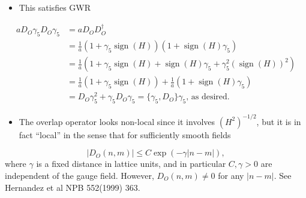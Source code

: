 \begin{itemize}
  \item This satisfies GWR
\end{itemize}

\begin{align}
    a D_O \gamma_5 D_O \gamma_5 &= a D_O D_O^\dagger \nonumber \\
    &=\frac{1}{a}(1 + \gamma_5 \operatorname{sign}(H))(1 + \operatorname{sign}(H)\gamma_5) \nonumber \\
    &=\frac{1}{a}(1 + \gamma_5 \operatorname{sign}(H) + \operatorname{sign}(H) \gamma_5 + \gamma_5^2(\operatorname{sign}(H))^2) \nonumber \\
    &=\frac{1}{a}(1 + \gamma_5 \operatorname{sign}(H))+\frac{1}{a}(1 + \operatorname{sign}(H)\gamma_5) \nonumber \\
    &=D_O\gamma_5^2 + \gamma_5D_O \gamma_5 = \{\gamma_5,D_O\}\gamma_5\text{, as desired.}
\end{align}

\begin{itemize}
    \item The overlap operator looks non-local since it involves $(H^2)^{-1/2}$, but it is in fact ``local'' in the sense that for sufficiently smooth fields
\end{itemize}
\begin{equation}
    |D_O(n,m)| \leq C \exp{(-\gamma|n-m|)},
\end{equation}
where $\gamma$ is a fixed distance in lattice units, and in particular $C,\gamma > 0$ are independent of the gauge field. However, $D_O(n,m) \neq 0$ for any $|n-m|$. See Hernandez et al NPB 552(1999) 363.

